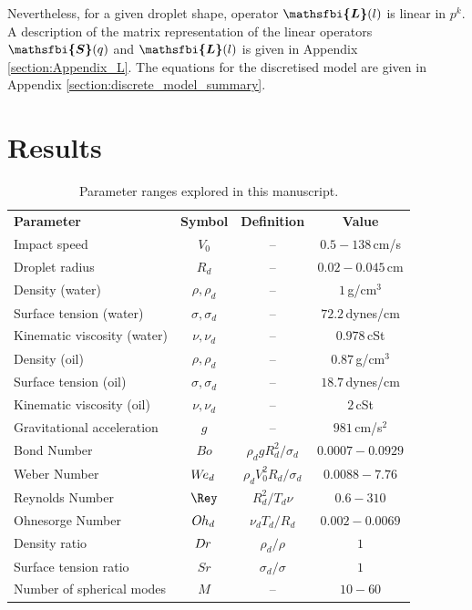 \documentclass{jfm}
\newcommand{\Ohd}{O\kern-0.04em h_d\,}
\newcommand{\Dr}{D\kern-0.04em r\,}
\newcommand{\Wed}{W\kern-0.15em e _d\,}
\newcommand{\bfjfm}[1]{\bm{\mathsfbi{#1}}}
\begin{document}
Nevertheless, for a given droplet shape, operator $\bfjfm{L}(l)$ is linear in $p^k$. A description of the matrix representation of the linear operators $\bfjfm{S}(q)$ and $\bfjfm{L}(l)$ is given in Appendix \ref{section:Appendix_L}. The equations for the discretised model are given in Appendix \ref{section:discrete_model_summary}.

\section{Results}\label{sec:results}
\begin{table}
\centering
\begin{tabular}{lccc}
\textbf{Parameter}       
& \textbf{Symbol} 
& \textbf{Definition} 
& \textbf{Value}
\\
Impact speed          
& $V_0$          
& --
& $0.5-138\,$cm/s
\\
Droplet radius  
& $R_d$
& --
& $0.02-0.045\,$cm
\\
Density (water)         
& $\rho, \rho_d$        
& --
& $1\,$g/cm$^3$
\\
Surface tension (water) 
& $\sigma, \sigma_d$        
& --                              
& $72.2 \,$dynes/cm
\\
Kinematic viscosity (water)
& $\nu, \nu_d$ 
& --
& $0.978\,$cSt
\\
Density (oil)         
& $\rho, \rho_d$        
& --
& $0.87\,$g/cm$^3$
\\
Surface tension (oil) 
& $\sigma, \sigma_d$        
& --                              
& $18.7 \,$dynes/cm
\\
Kinematic viscosity (oil)
& $\nu, \nu_d$ 
& --
& $2\,$cSt
\\
Gravitational acceleration
& $g$
& --
& $981\,$cm/s$^2$
\\
Bond Number
& $Bo$ 
& $\rho_d g R_d^2/\sigma_d$  
& 
$0.0007-0.0929$%
\\
Weber Number
& $\Wed$     
& $\rho_d V_0^2 R_d/\sigma_d$ 
& 
$0.0088-7.76$
\\      
Reynolds Number
& $\Rey$
& $R_d^2/T_d\nu$
& $0.6-310$
\\
Ohnesorge Number
& $\Ohd$ 
& $\nu_d T_d / R_d$  
& 
$0.002-0.0069$
\\
Density ratio
& $\Dr$ 
& $ \rho_d  /\rho$  
& 
$1$%
\\
Surface tension ratio
& $ Sr$
& $\sigma_d/\sigma$
& 
$1$
\\
Number of spherical modes
& $M$
&  --
& 
$10-60$%
\\
\hline
\end{tabular}
\caption{Parameter ranges explored in this manuscript.\label{tab:parameters}}
\end{table}
\end{document}
